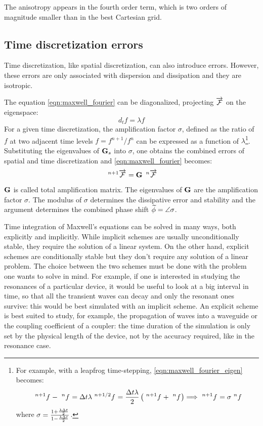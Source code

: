 The anisotropy appears in the fourth order term, which is two orders
of magnitude smaller than in the best Cartesian grid.

\subsection{Time discretization errors}

Time discretization, like spatial discretization, can also introduce
errors. However, these errors are only associated with dispersion and
dissipation and they are isotropic.

The equation \ref{eqn:maxwell_fourier} can be diagonalized, projecting
$\Vector{\mathcal{F}}$ on the eigenspace:
\begin{equation} \label{eqn:maxwell_fourier_eigen}
d_t f = \lambda f
\end{equation}
For a given time discretization, the amplification factor $\sigma$,
defined as the ratio of $f$ at two adjacent time levels $f = f^{n+1} /
f^n$ can be expressed as a function of $\lambda$\footnote{For example,
with a leapfrog time-stepping, \ref{eqn:maxwell_fourier_eigen} becomes:
$$
\Disc{f}{}{n+1} - \Disc{f}{}{n} = \deltat \lambda \Disc{f}{}{n+1/2} =
\frac{\deltat \lambda}{2} \left( \Disc{f}{}{n+1} + \Disc{f}{}{n}
\right) \Longrightarrow \Disc{f}{}{n+1} = \sigma \Disc{f}{}{n}
$$
where $\sigma = \frac{1+\frac{\lambda \deltat}{2}}{1-\frac{\lambda
    \deltat}{2}}$.
}.
Substituting the eigenvalues of $\Matrix{G}_s$ into $\sigma$, one
obtains the combined errors of spatial and time discretization and
\ref{eqn:maxwell_fourier} becomes:
$$
\Disc{\Vector{\mathcal{F}}}{}{n+1} = \Prod{\Matrix{G}}{\Disc{\Vector{\mathcal{F}}}{}{n}}
$$
$\Matrix{G}$ is called total amplification matrix. The eigenvalues of
$\Matrix{G}$ are the amplification factor $\sigma$. The modulus of
$\sigma$ determines the dissipative error and stability and the
argument determines the combined phase shift $\Dual{\phi} =
\Arg{\sigma}$.

Time integration of Maxwell's equations can be solved in many ways,
both explicitly and implicitly. While implicit schemes are usually
unconditionally stable, they require the solution of a linear
system. On the other hand, explicit schemes are conditionally stable
but they don't require any solution of a linear problem. The choice
between the two schemes must be done with the problem one wants to
solve in mind. For example, if one is interested in studying the
resonances of a particular device, it would be useful to look at a big
interval in time, so that all the transient waves can decay and only
the resonant ones survive: this would be best simulated with an
implicit scheme. An explicit scheme is best suited to study, for
example, the propagation of waves into a waveguide or the coupling
coefficient of a coupler: the time duration of the simulation is only
set by the physical length of the device, not by the accuracy
required, like in the resonance case.

